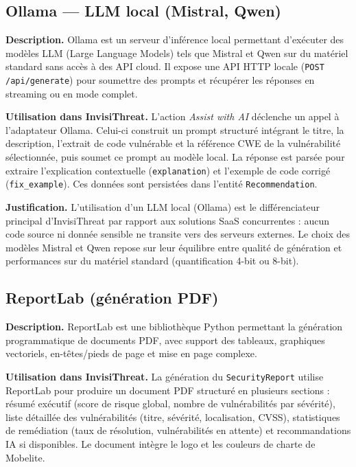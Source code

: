 \subsection{Ollama — LLM local (Mistral, Qwen)}

\textbf{Description.} Ollama est un serveur d'inférence local permettant d'exécuter des modèles LLM (Large Language Models) tels que Mistral et Qwen sur du matériel standard sans accès à des API cloud. Il expose une API HTTP locale (\texttt{POST /api/generate}) pour soumettre des prompts et récupérer les réponses en streaming ou en mode complet.

\textbf{Utilisation dans InvisiThreat.} L'action \textit{Assist with AI} déclenche un appel à l'adaptateur Ollama. Celui-ci construit un prompt structuré intégrant le titre, la description, l'extrait de code vulnérable et la référence CWE de la vulnérabilité sélectionnée, puis soumet ce prompt au modèle local. La réponse est parsée pour extraire l'explication contextuelle (\texttt{explanation}) et l'exemple de code corrigé (\texttt{fix\_example}). Ces données sont persistées dans l'entité \texttt{Recommendation}.

\textbf{Justification.} L'utilisation d'un LLM local (Ollama) est le différenciateur principal d'InvisiThreat par rapport aux solutions SaaS concurrentes : aucun code source ni donnée sensible ne transite vers des serveurs externes. Le choix des modèles Mistral et Qwen repose sur leur équilibre entre qualité de génération et performances sur du matériel standard (quantification 4-bit ou 8-bit).

\subsection{ReportLab (génération PDF)}

\textbf{Description.} ReportLab est une bibliothèque Python permettant la génération programmatique de documents PDF, avec support des tableaux, graphiques vectoriels, en-têtes/pieds de page et mise en page complexe.

\textbf{Utilisation dans InvisiThreat.} La génération du \texttt{SecurityReport} utilise ReportLab pour produire un document PDF structuré en plusieurs sections : résumé exécutif (score de risque global, nombre de vulnérabilités par sévérité), liste détaillée des vulnérabilités (titre, sévérité, localisation, CVSS), statistiques de remédiation (taux de résolution, vulnérabilités en attente) et recommandations IA si disponibles. Le document intègre le logo et les couleurs de charte de Mobelite.

